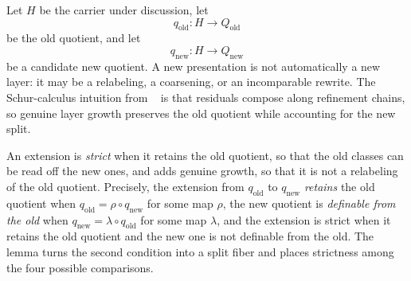 Let \(H\) be the carrier under discussion, let
\[
  q_{\mathrm{old}}:H\to Q_{\mathrm{old}}
\]
be the old quotient, and let
\[
  q_{\mathrm{new}}:H\to Q_{\mathrm{new}}
\]
be a candidate new quotient.  A new presentation is not
automatically a new layer: it may be a relabeling, a coarsening, or
an incomparable rewrite.  The Schur-calculus intuition from
\PaperAR\ \citep{Tsiokos2026XiCompanion} is that residuals compose
along refinement chains, so genuine layer growth preserves the old
quotient while accounting for the new split.

An extension is \emph{strict} when it retains the old quotient, so that the
old classes can be read off the new ones, and adds genuine growth, so that
it is not a relabeling of the old quotient. Precisely, the extension from
\(q_{\mathrm{old}}\) to \(q_{\mathrm{new}}\) \emph{retains} the old quotient
when \(q_{\mathrm{old}}=\rho\circ q_{\mathrm{new}}\) for some map \(\rho\), the
new quotient is \emph{definable from the old} when
\(q_{\mathrm{new}}=\lambda\circ q_{\mathrm{old}}\) for some map \(\lambda\), and
the extension is strict when it retains the old quotient and the new one is
not definable from the old. The lemma turns the second condition into a
split fiber and places strictness among the four possible comparisons.

